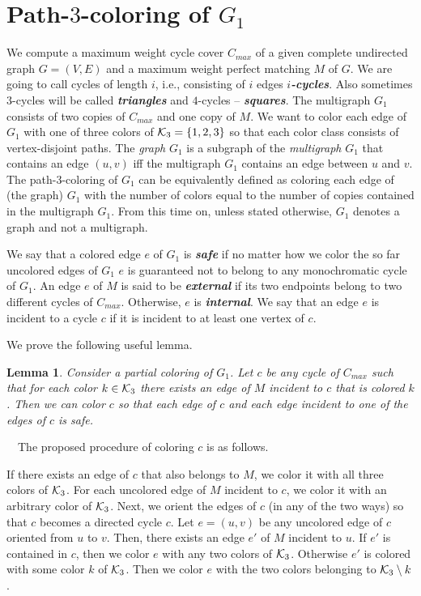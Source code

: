 \documentclass[a4, 11pt]{article}
\newcommand{\dowod}{\noindent{\bf Proof.~}}
\newcommand{\<}{\langle}
\renewcommand{\>}{\rangle}
\newcommand{\Kt}{{\cal K}_3}
\newtheorem{lemma}{Lemma}
\begin{document}
\section{Path-$3$-coloring of $G_1$}
We  compute a maximum weight cycle cover $C_{max}$ of a given complete undirected graph $G=(V,E)$ and a maximum weight perfect matching $M$ of $G$.
We are going to call cycles of length $i$, i.e., consisting of $i$ edges {\bf \em $i$-cycles}. Also sometimes $3$-cycles will be called {\bf \em triangles} and $4$-cycles -- {\bf \em squares}.
The multigraph $G_1$ consists of two copies of $C_{max}$ and one copy of $M$. We want to color each edge of $G_1$ with one of three colors of $\Kt =\{1,2,3\}$  so that each color class consists of vertex-disjoint  paths. 
The {\em graph} $G_1$ is a subgraph of the {\em multigraph} $G_1$ that contains an edge $(u,v)$  iff the multigraph $G_1$ contains an edge between $u$ and $v$. The path-$3$-coloring of $G_1$ can be equivalently defined as coloring each edge of (the graph) $G_1$ with the number of colors equal to the number of copies contained in the multigraph $G_1$. From this time on, unless stated otherwise, $G_1$ denotes a graph
and not a multigraph.



We say that a colored edge $e$ of  $G_1$  is {\bf \em safe}  if no matter how we color the so far uncolored edges of $G_1$ $e$ is guaranteed not to belong to any monochromatic cycle of $G_1$. An edge $e$ of $M$ is said to be {\bf \em external} if its two endpoints belong to two different cycles of $C_{max}$. Otherwise, $e$ is {\bf \em internal}.
We say that an edge $e$ is incident to a cycle $c$ if it is incident to at least one vertex of $c$.

We prove the following useful lemma.
\begin{lemma} \label{col}
Consider a partial coloring of $G_1$. Let $c$ be any cycle of $C_{max}$ such that for each color $k \in \Kt$ there exists an edge of $M$ incident to $c$ that is colored $k$. Then we can color $c$ so that each edge of $c$ and each edge incident to one of the edges of $c$ is safe.
\end{lemma}

\dowod   \ \ The proposed procedure of coloring $c$ is as follows.

If there exists an edge of $c$ that also belongs to $M$, we color it with all three colors of $\Kt$. For each uncolored edge of $M$ incident to $c$, we color it with an arbitrary color of $\Kt$.
Next, we orient the edges of $c$ (in any of the two ways) so that $c$ becomes a directed cycle $c$. Let $e=(u,v)$ be any  uncolored edge of $c$ oriented from $u$ to $v$. Then, there exists an edge $e'$ of $M$ incident to $u$. If $e'$ is contained in $c$, then we color $e$ with any two colors of $\Kt$. Otherwise $e'$ is colored with some color $k$ of $\Kt$.
Then we color $e$ with the two colors belonging to $\Kt \setminus k$.
\end{document}
